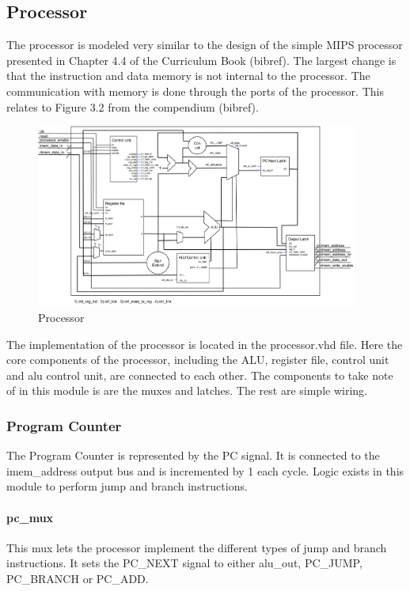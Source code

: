 \subsection{Processor}

The processor is modeled very similar to the design of the simple MIPS processor presented in Chapter 4.4 of the Curriculum Book (bibref). The largest change is that the instruction and data memory is not internal to the processor. The communication with memory is done through the ports of the processor. This relates to Figure 3.2 from the compendium (bibref). 

\begin{figure}[h]
	\includegraphics[width=400px]{figures/processor.png}
	\caption{Processor}
\end{figure}

The implementation of the processor is located in the processor.vhd file. Here the core components of the processor, including the ALU, register file, control unit and alu control unit, are connected to each other. The components to take note of in this module is are the muxes and latches. The rest are simple wiring. 

\subsubsection{Program Counter}
The Program Counter is represented by the PC signal. It is connected to the imem\_address output bus and is incremented by 1 each cycle. Logic exists in this module to perform jump and branch instructions. 

\paragraph{pc\_mux} This mux lets the processor implement the different types of jump and branch instructions. It sets the PC\_NEXT signal to either alu\_out, PC\_JUMP, PC\_BRANCH or PC\_ADD. 

